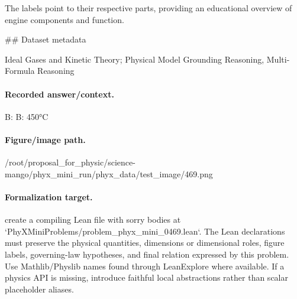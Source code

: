 The labels point to their respective parts, providing an educational overview of engine components and function.

\#\# Dataset metadata

Ideal Gases and Kinetic Theory; Physical Model Grounding Reasoning, Multi-Formula Reasoning

\paragraph{Recorded answer/context.}
B: B: 450°C

\paragraph{Figure/image path.}
/root/proposal\_for\_physic/science-mango/phyx\_mini\_run/phyx\_data/test\_image/469.png

\paragraph{Formalization target.}
create a compiling Lean file with sorry bodies at `PhyXMiniProblems/problem\_phyx\_mini\_0469.lean`. The Lean declarations must preserve the physical quantities, dimensions or dimensional roles, figure labels, governing-law hypotheses, and final relation expressed by this problem.
Use Mathlib/Physlib names found through LeanExplore where available. If a physics API is missing, introduce faithful local abstractions rather than scalar placeholder aliases.

